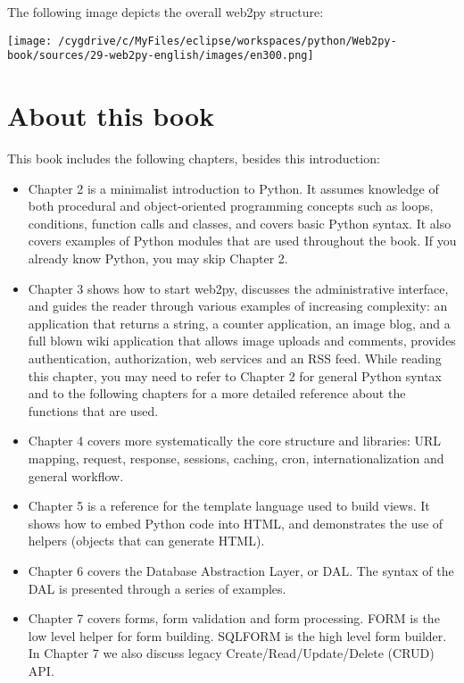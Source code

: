 \documentclass[justified,sixbynine,notoc]{tufte-book}
\begin{document}
\begin{fullwidth}
The following image depicts the overall web2py structure:


\goodbreak\begin{center}\texttt{[image: /cygdrive/c/MyFiles/eclipse/workspaces/python/Web2py-book/sources/29-web2py-english/images/en300.png]}\end{center}


\goodbreak\section{About this book}

This book includes the following chapters, besides this introduction:
\begin{itemize}
\item Chapter 2 is a minimalist introduction to Python. It assumes knowledge of both procedural and object-oriented programming concepts such as loops, conditions, function calls and classes, and covers basic Python syntax. It also covers examples of Python modules that are used throughout the book. If you already know Python, you may skip Chapter 2.

\item Chapter 3 shows how to start web2py, discusses the administrative interface, and guides the reader through various examples of increasing complexity: an application that returns a string, a counter application, an image blog, and a full blown wiki application that allows image uploads and comments, provides authentication, authorization, web services and an RSS feed. While reading this chapter, you may need to refer to Chapter 2 for general Python syntax and to the following chapters for a more detailed reference about the functions that are used.

\item Chapter 4 covers more systematically the core structure and libraries: URL mapping, request, response, sessions, caching, cron, internationalization and general workflow.

\item Chapter 5 is a reference for the template language used to build views. It shows how to embed Python code into HTML, and demonstrates the use of helpers (objects that can generate HTML).

\item Chapter 6 covers the Database Abstraction Layer, or DAL. The syntax of the DAL is presented through a series of examples.

\item Chapter 7 covers forms, form validation and form processing. FORM is the low level helper for form building. SQLFORM is the high level form builder. In Chapter 7 we also discuss legacy Create/Read/Update/Delete (CRUD) API.


\end{itemize}
\end{fullwidth}
\end{document}
